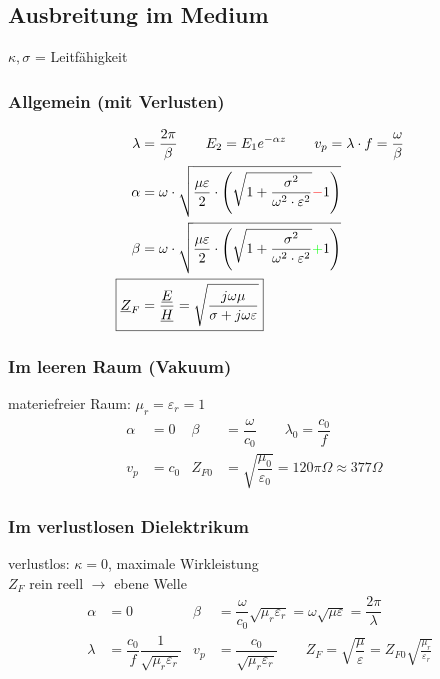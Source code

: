 \subsection{Ausbreitung im Medium}
$ \kappa, \sigma $ = Leitfähigkeit
\subsubsection{Allgemein (mit Verlusten)}
\begin{align*}
    \lambda                 & = \dfrac{2\pi}{\beta} \qquad E_2 = E_1 e^{-\alpha z}         \qquad                                                                            
    v_p                      = \lambda\cdot f = \dfrac{\omega}{\beta}                                                                                                    \\
    \alpha                  & = \omega \cdot \sqrt{\dfrac{\mu \varepsilon}{2}\cdot \left(\sqrt{1+\dfrac{\sigma^2}{\omega^2\cdot\varepsilon^2}}{\color{red}{-}}1\right)}   \\
    \beta                   & = \omega \cdot \sqrt{\dfrac{\mu \varepsilon}{2}\cdot \left(\sqrt{1+\dfrac{\sigma^2}{\omega^2\cdot\varepsilon^2}}{\color{green}{+}}1\right)} \\
    \Aboxed{\underline{Z}_F & = \dfrac{\underline{E}}{\underline{H}} = \sqrt{\dfrac{j\omega\mu}{\sigma+j\omega\varepsilon}}}
\end{align*}

\subsubsection{Im leeren Raum (Vakuum)}
materiefreier Raum: $ \mu_r = \varepsilon_r = 1 $
\begin{align*}
    \alpha                     & = 0 &
    \beta                      & = \dfrac{\omega}{c_0} \qquad 
    \lambda_0                   = \dfrac{c_0}{f} \\
    v_p                        & = c_0 &
Z_{F0} & = \sqrt{\dfrac{\mu_0}{\varepsilon_0}} = 120 \pi\Omega\approx377\Omega &
\end{align*}
\subsubsection{Im verlustlosen Dielektrikum}
verlustlos: $\kappa =0$, maximale Wirkleistung\\
$Z_F$ rein reell $\rightarrow$ ebene Welle
\begin{align*}
    \alpha                  & = 0 &
    \beta                   & = \dfrac{\omega}{c_0}\sqrt{\mu_r\varepsilon_r}=\omega\sqrt{\mu\varepsilon}=\dfrac{2\pi}{\lambda} \\
    \lambda                 & = \dfrac{c_0}{f}\dfrac{1}{\sqrt{\mu_r\varepsilon_r}} &
    v_p                     & = \dfrac{c_0}{\sqrt{\mu_r\varepsilon_r}}         \qquad
    \boxed{Z_F = \sqrt{\dfrac{\mu}{\varepsilon}}=Z_{F0}\sqrt{\frac{\mu_r}{\varepsilon_r}}}
\end{align*}

